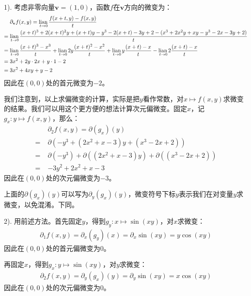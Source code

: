 \documentclass[12pt,UTF8]{ctexbook}
\begin{document}
\begin{so}
    \mbox{} \\
    1). 考虑非零向量$\mathbf{v} = (1,0)$，函数$f$在$\mathbf{v}$方向的微变为：
    \begin{align*}
        &\partial_{\mathbf{v}} f (x, y) = \underset{t\to 0}{\operatorname{lian}\,}\frac{f(x+t,y) - f(x,y)}{t} \\
        =\;& \underset{t\to 0}{\operatorname{lian}\,}\frac{(x+t)^3 + 2(x+t)^2y + (x+t)y - y^3 - 2(x+t) - 3y + 2 - (x^3 + 2x^2y + xy - y^3 - 2x - 3y + 2)}{t} \\
        =\;& \underset{t\to 0}{\operatorname{lian}\,}\frac{(x+t)^3 - x^3}{t} + \underset{t\to 0}{\operatorname{lian}\,} 2y\frac{(x+t)^2 - x^2}{t} + \underset{t\to 0}{\operatorname{lian}\,}y\frac{(x+t) - x}{t} - \underset{t\to 0}{\operatorname{lian}\,}2\frac{(x+t) - x}{t} \\
        =\;& 3x^2 + 2y\cdot 2x + y\cdot 1 - 2 \\
        =\;& 3x^2 + 4xy + y - 2
    \end{align*}
    因此在$(0,0)$处的首元微变为$-2$。

    我们注意到，以上求偏微变的计算，实际是把$y$看作常数，对$x\mapsto f(x,y)$求微变的结果。我们可以用这个更方便的想法计算次元偏微变。固定$x$，记$g_x: y\mapsto f(x, y)$，那么：
    \begin{align*}
        &\partial_{2} f (x, y) =\partial (g_x) (y) \\
        =\;& \partial \left(-y^3 + (2x^2 + x - 3)y + (x^3  - 2x + 2) \right) \\
        =\;& \partial \left(-y^3\right) +  \partial \left((2x^2 + x - 3)y \right) +  \partial \left((x^3  - 2x + 2) \right) \\
        =\;& -3y^2 + 2x^2 + x - 3
    \end{align*}
    因此在$(0,0)$处的次元偏微变为$-3$。

    上面的$\partial (g_x) (y)$可以写为$\partial_y (g_x) (y)$，微变符号下标$y$表示我们在对变量$y$求微变，以免混淆。下同。

    2). 用前述方法。首先固定$y$，得到$g_y: x\mapsto \sin{(xy)} $，对$x$求微变：
    \begin{align*}
        \partial_{1} f (x, y) = \partial_x (g_y) (x) = \partial_x \sin{(xy)} = y\cos{(xy)}
    \end{align*}
    因此在$(0,0)$处的首元偏微变为$0$。

    再固定$x$，得到$g_x: y\mapsto \sin{(xy)} $，对$y$求微变：
    \begin{align*}
        \partial_{2} f (x, y) = \partial_y (g_x) (y) = \partial_y \sin{(xy)} = x\cos{(xy)}
    \end{align*}
    因此在$(0,0)$处的次元偏微变为$0$。


\end{so}
\end{document}
